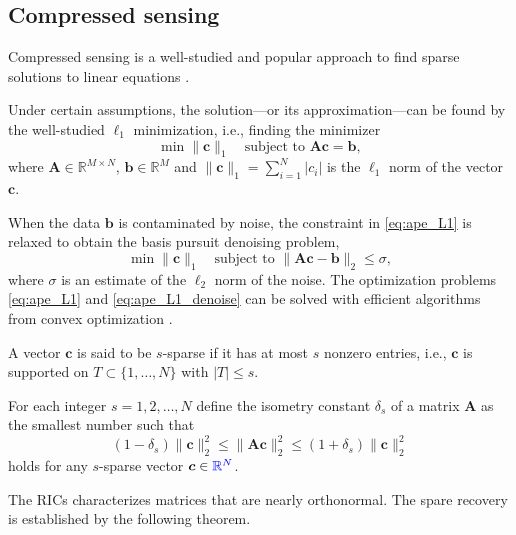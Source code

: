 \subsection{Compressed sensing} \label{sec:cs}

Compressed sensing is a well-studied and popular approach to find sparse solutions to linear equations \cite{Candes_2005error, Candes_2008Rip, Davies_2010RICLp,Donoho_2006srs}.

Under certain assumptions, the solution---or its approximation---can be found 
by the well-studied $\ell_1$ minimization, i.e., finding the minimizer
\begin{equation}\label{eq:ape_L1}
    \min \|\bm{c}\|_1 \quad \text{subject to }\bm A\bm{c}=\bm{b},
\end{equation}
where $\bm{A}\in\mathbb{R}^{M\times N}$, $\bm b \in \mathbb{R}^M$ 
and $\|\bm{c}\|_1 = \sum_{i=1}^N|c_i|$ is the $\ell_1$ norm of the vector $\bm{c}$.

When the data $\bm b$ is contaminated by noise, the constraint in \eqref{eq:ape_L1} is relaxed to obtain the basis pursuit denoising problem,
\begin{equation}\label{eq:ape_L1_denoise}
    \min \|\bm{c}\|_1 \quad \text{subject to }\|\bm A\bm{c}-\bm{b}\|_2\leq \sigma,
\end{equation}
where $\sigma$ is an estimate of the $\ell_2$ norm of the noise.
The optimization problems \eqref{eq:ape_L1} and \eqref{eq:ape_L1_denoise} can be solved with efficient algorithms from convex optimization \cite{Berg_2007spgl}.

\begin{defn} \label{def:s-sparse-vec}
    A vector $\bm{c}$ is said to be $s$-sparse if it has at most $s$ nonzero entries, i.e., $\bm{c}$ is supported on $T \subset \{1,\dots,N\}$ with $|T|\leq s$.
\end{defn}
\begin{defn}\label{def:RIC}
    For each integer $s=1,2,\ldots,\label{blue}{N}$ define the isometry constant $\delta_s$ of a matrix $\bm A$ as the smallest number such that
    \begin{equation*}
        (1-\delta_s)\|\bm{c}\|_2^2\leq\|\bm A\bm{c}\|_2^2\leq(1+\delta_s)\|\bm{c}\|_2^2
    \end{equation*}
    holds for any $s$-sparse vector $\bm{c}\in \textcolor{blue}{\mathbb{R}^{N}}$. 
\end{defn}
The \acp{RIC} characterizes matrices that are nearly orthonormal. The spare recovery is established by the following theorem. 

